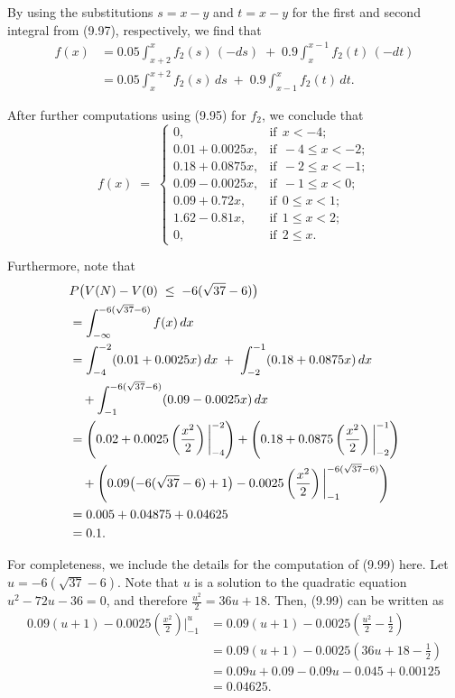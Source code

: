 By using the substitutions $s=x-y$ and $t=x-y$ for the first and second
integral from (9.97), respectively, we find that
\[
\begin{aligned}
f(x) &= 0.05\int_{x+2}^{x} f_2(s)\,(-ds) \;+\; 0.9\int_{x}^{x-1} f_2(t)\,(-dt)\\
&= 0.05\int_{x}^{x+2} f_2(s)\,ds \;+\; 0.9\int_{x-1}^{x} f_2(t)\,dt.
\end{aligned}
\]

After further computations using (9.95) for $f_2$, we conclude that
\[
f(x) \;=\;
\begin{cases}
0, & \text{if} \ \ x < -4;\\
0.01+0.0025x, & \text{if} \ \ -4 \le x < -2;\\
0.18+0.0875x, & \text{if} \ \ -2 \le x < -1;\\
0.09-0.0025x, & \text{if} \ \ -1 \le x < 0;\\
0.09+0.72x, & \text{if} \ \ 0 \le x < 1;\\
1.62-0.81x, & \text{if} \ \ 1 \le x < 2;\\
0, & \text{if} \ \ 2 \le x.
\end{cases}
\]

Furthermore, note that
\begin{align}
&P\bigl(V(N) - V(0) \;\le\; -6(\sqrt{37}-6)\bigr)\\
&= \int_{-\infty}^{-6(\sqrt{37}-6)} f(x)\,dx \notag\\
&= \int_{-4}^{-2}(0.01+0.0025x)\,dx \;+\; \int_{-2}^{-1}(0.18+0.0875x)\,dx \notag\\
&\quad +\int_{-1}^{-6(\sqrt{37}-6)}(0.09-0.0025x)\,dx \notag\\
&= \left(0.02+0.0025\left(\frac{x^2}{2}\right)\bigg|_{-4}^{-2}\right) + \left(0.18+0.0875\left(\frac{x^2}{2}\right)\bigg|_{-2}^{-1}\right) \notag\\
&\quad + \left(0.09\bigl(-6(\sqrt{37}-6)+1\bigr) - 0.0025\left(\frac{x^2}{2}\right)\bigg|_{-1}^{-6(\sqrt{37}-6)}\right)\\
&= 0.005 + 0.04875 + 0.04625 \notag\\
&= 0.1.
\end{align}

For completeness, we include the details for the computation of (9.99) here.
Let $u = -6(\sqrt{37}-6)$. Note that $u$ is a solution to the quadratic
equation $u^2-72u-36=0$, and therefore $\frac{u^2}{2} = 36u+18$. Then, (9.99)
can be written as
\[
\begin{aligned}
0.09(u+1) - 0.0025\left(\frac{x^2}{2}\right)\bigg|_{-1}^{u} &= 0.09(u+1) - 0.0025\left(\frac{u^2}{2} - \frac{1}{2}\right)\\
&= 0.09(u+1) - 0.0025\left(36u+18-\frac{1}{2}\right)\\
&= 0.09u + 0.09 - 0.09u - 0.045 + 0.00125\\
&= 0.04625.
\end{aligned}
\]

